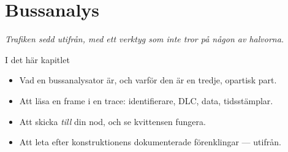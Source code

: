 \chapter{Bussanalys}
\label{ch:analys}


{\large\itshape Trafiken sedd utifrån, med ett verktyg som inte tror på någon av halvorna.\par}

\begin{chapterbox}{I det här kapitlet}
\begin{itemize}
  \item Vad en bussanalysator är, och varför den är en tredje, opartisk part.
  \item Att läsa en frame i en trace: identifierare, DLC, data, tidsstämplar.
  \item Att skicka \emph{till} din nod, och se kvittensen fungera.
  \item Att leta efter konstruktionens dokumenterade förenklingar --- utifrån.
\end{itemize}
\end{chapterbox}




